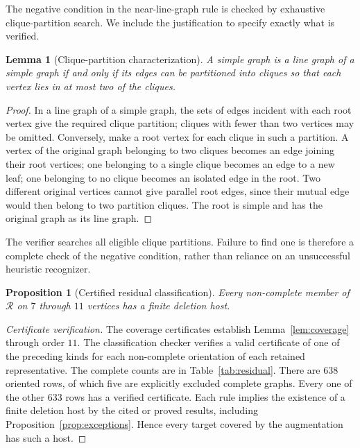 \documentclass[11pt,reqno]{amsart}
\newtheorem{lemma}[theorem]{Lemma}
\newtheorem{proposition}[theorem]{Proposition}
\theoremstyle{definition}
\theoremstyle{remark}
\newcommand{\Rclass}{\mathcal{R}}
\begin{document}
The negative condition in the near-line-graph rule is checked by exhaustive clique-partition search. We include the justification to specify exactly what is verified.

\begin{lemma}[Clique-partition characterization]\label{lem:krausz}
A simple graph is a line graph of a simple graph if and only if its edges can be partitioned into cliques so that each vertex lies in at most two of the cliques.
\end{lemma}
\begin{proof}
In a line graph of a simple graph, the sets of edges incident with each root vertex give the required clique partition; cliques with fewer than two vertices may be omitted. Conversely, make a root vertex for each clique in such a partition. A vertex of the original graph belonging to two cliques becomes an edge joining their root vertices; one belonging to a single clique becomes an edge to a new leaf; one belonging to no clique becomes an isolated edge in the root. Two different original vertices cannot give parallel root edges, since their mutual edge would then belong to two partition cliques. The root is simple and has the original graph as its line graph.
\end{proof}

The verifier searches all eligible clique partitions. Failure to find one is therefore a complete check of the negative condition, rather than reliance on an unsuccessful heuristic recognizer.

\begin{proposition}[Certified residual classification]\label{prop:finite-classification}
Every non-complete member of $\Rclass$ on $7$ through $11$ vertices has a finite deletion host.
\end{proposition}
\begin{proof}[Certificate verification]
The coverage certificates establish Lemma~\ref{lem:coverage} through order $11$. The classification checker verifies a valid certificate of one of the preceding kinds for each non-complete orientation of each retained representative. The complete counts are in Table~\ref{tab:residual}. There are $638$ oriented rows, of which five are explicitly excluded complete graphs. Every one of the other $633$ rows has a verified certificate. Each rule implies the existence of a finite deletion host by the cited or proved results, including Proposition~\ref{prop:exceptions}. Hence every target covered by the augmentation has such a host.
\end{proof}
\end{document}
